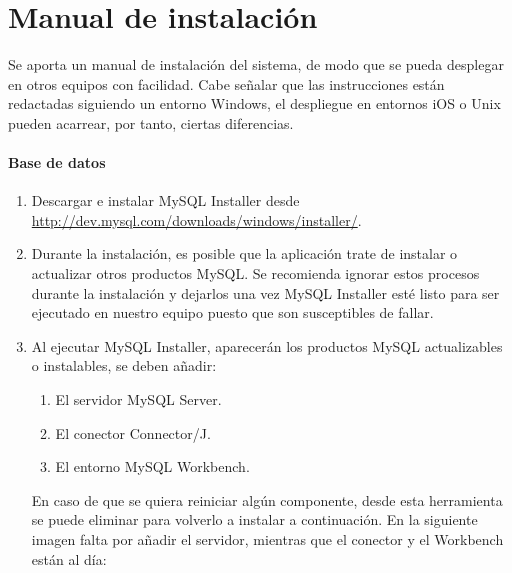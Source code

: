 \chapter{Manual de instalación}

Se aporta un manual de instalación del sistema, de modo que se pueda desplegar en otros equipos con facilidad. Cabe señalar que las instrucciones están redactadas siguiendo un entorno Windows, el despliegue en entornos iOS o Unix pueden acarrear, por tanto, ciertas diferencias.

\subsubsection{Base de datos}

\begin{enumerate}
	\item Descargar e instalar MySQL Installer desde \url{http://dev.mysql.com/downloads/windows/installer/}.
	\item Durante la instalación, es posible que la aplicación trate de instalar o actualizar otros productos MySQL. Se recomienda ignorar estos procesos durante la instalación y dejarlos una vez MySQL Installer esté listo para ser ejecutado en nuestro equipo puesto que son susceptibles de fallar.
	\item Al ejecutar MySQL Installer, aparecerán los productos MySQL actualizables o instalables, se deben añadir:
	\begin{enumerate}
		\item El servidor MySQL Server.
		\item El conector Connector/J.
		\item El entorno MySQL Workbench.
	\end{enumerate}
	En caso de que se quiera reiniciar algún componente, desde esta herramienta se puede eliminar para volverlo a instalar a continuación. En la siguiente imagen falta por añadir el servidor, mientras que el conector y el Workbench están al día:
	\begin{figure} [!htb]
		\centering

\end{figure}
\end{enumerate}
